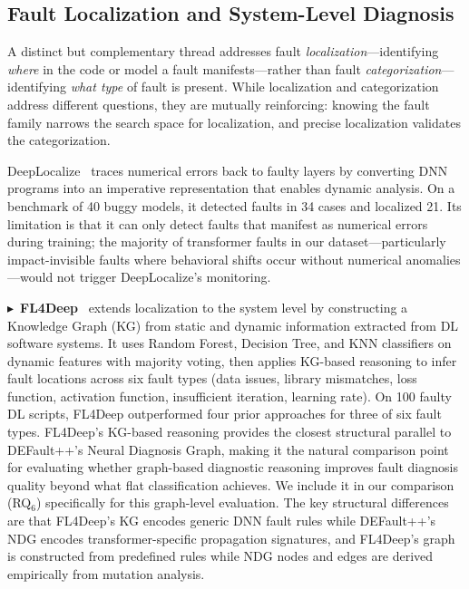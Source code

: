 \subsection{Fault Localization and System-Level Diagnosis}
\label{subsec:rw_localization}

A distinct but complementary thread addresses fault \emph{localization}---identifying \emph{where} in the code or model a fault manifests---rather than fault \emph{categorization}---identifying \emph{what type} of fault is present. While localization and categorization address different questions, they are mutually reinforcing: knowing the fault family narrows the search space for localization, and precise localization validates the categorization.

DeepLocalize~\cite{deeplocalize} traces numerical errors back to faulty layers by converting DNN programs into an imperative representation that enables dynamic analysis. On a benchmark of 40 buggy models, it detected faults in 34 cases and localized 21. Its limitation is that it can only detect faults that manifest as numerical errors during training; the majority of transformer faults in our dataset---particularly impact-invisible faults where behavioral shifts occur without numerical anomalies---would not trigger DeepLocalize's monitoring.

$\blacktriangleright$~\textbf{FL4Deep}~\cite{fl4deep} extends localization to the system level by constructing a Knowledge Graph (KG) from static and dynamic information extracted from DL software systems. It uses Random Forest, Decision Tree, and KNN classifiers on dynamic features with majority voting, then applies KG-based reasoning to infer fault locations across six fault types (data issues, library mismatches, loss function, activation function, insufficient iteration, learning rate). On 100 faulty DL scripts, FL4Deep outperformed four prior approaches for three of six fault types. FL4Deep's KG-based reasoning provides the closest structural parallel to DEFault++'s Neural Diagnosis Graph, making it the natural comparison point for evaluating whether graph-based diagnostic reasoning improves fault diagnosis quality beyond what flat classification achieves. We include it in our comparison (RQ$_6$) specifically for this graph-level evaluation. The key structural differences are that FL4Deep's KG encodes generic DNN fault rules while DEFault++'s NDG encodes transformer-specific propagation signatures, and FL4Deep's graph is constructed from predefined rules while NDG nodes and edges are derived empirically from mutation analysis.

